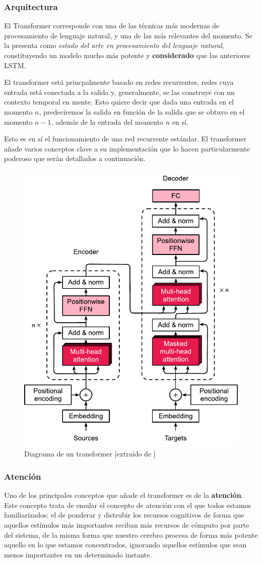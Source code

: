 \subsubsection{Arquitectura}
El Transformer corresponde con una de las técnicas más modernas de procesamiento de lenguaje natural, y una de las más relevantes del momento. Se la presenta como \textit{estado del arte en procesamiento del lenguaje natural}, constituyendo un modelo mucho más potente y \textbf{considerado} que las anteriores LSTM.

El transformer está princpalmente basado en redes recurrentes, redes cuya entrada está conectada a la salida y, generalmente, se las construye con un contexto temporal en mente. Esto quiere decir que dada una entrada en el momento $n$, predeciremos la salida en función de la salida que se obtuvo en el momento $n - 1$, además de la entrada del momento $n$ en sí.

Esto es en sí el funcionamiento de una red recurrente estándar. El transformer añade varios conceptos clave a su implementación que lo hacen particularmente poderoso que serán detallados a continuación.

\begin{figure}[h]
    \centering
    \includegraphics[width=.5\textwidth]{media/transformer.pdf}
    \caption{Diagrama de un transformer [extraído de \cite{TransformerAshish2017}]}
    \label{fig:transformer}
\end{figure}

\subsubsection{Atención}
Uno de los principales conceptos que añade el transformer es de la \textbf{atención}. Este concepto trata de emular el concepto de atención con el que todos estamos familiarizados: el de ponderar y distrubir los recursos cognitivos de forma que aquellos estímulos más importantes reciban más recursos de cómputo por parte del sistema, de la misma forma que nuestro cerebro procesa de forma más potente aquello en lo que estamos concentrados, ignorando aquellos estímulos que sean menos importantes en un determinado instante.

